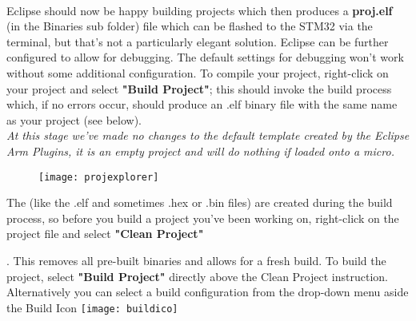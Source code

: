 {{\\
Eclipse should now be happy building projects which then produces a \textbf{\color{Aquamarine} proj.elf} (in the Binaries sub folder) file which can be flashed to the STM32 via the terminal, but that's not a particularly elegant solution. Eclipse can be further configured to allow for debugging. The default settings for debugging won't work without some additional configuration.
\newpage
To compile your project, right-click on your project and select \textbf{\color{Purple} "Build Project"}; this should invoke the build process which, if no errors occur, should produce an .elf binary file with the same name as your project (see below).
\\
\emph{\color{Gray} At this stage we've made no changes to the default template created by the Eclipse Arm Plugins, it is an empty project and will do nothing if loaded onto a micro.}
\\
\begin{figure}[htbp]
\centering
\texttt{[image: projexplorer]}
\end{figure}
\par
\raggedright
The \underline{} (like the .elf and sometimes .hex or .bin files) are created during the build process, so before you build a project you've been working on, right-click on the project file and select \textbf{\color{Purple} "Clean Project"}}\color{Black}. This removes all pre-built binaries and allows for a fresh build. To build the project, select \textbf{\color{Purple} "Build Project"} directly above the Clean Project instruction.  Alternatively you can select a build configuration from the drop-down menu aside the Build Icon \texttt{[image: buildico]}
\\
\newpage
\justifying
}
